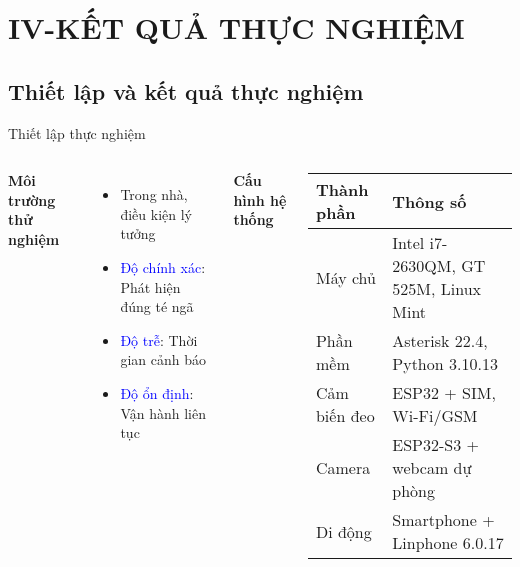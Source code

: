 \section{IV-KẾT QUẢ THỰC NGHIỆM}
\subsection{Thiết lập và kết quả thực nghiệm} 

\begin{frame}{Thiết lập thực nghiệm}
    \begin{columns}[T]
        \textbf{Môi trường thử nghiệm}
        \vspace{0.2cm}
        \begin{itemize}
            \item Trong nhà, điều kiện lý tưởng
            \item \textcolor{blue}{Độ chính xác}: Phát hiện đúng té ngã
            \item \textcolor{blue}{Độ trễ}: Thời gian cảnh báo
            \item \textcolor{blue}{Độ ổn định}: Vận hành liên tục
        \end{itemize}

        \textbf{Cấu hình hệ thống}
        \vspace{0.2cm}
        \begin{table}[h!]
            \centering
            \footnotesize
            \begin{tabular}{|p{2.5cm}|p{4cm}|}
                \hline
                \textbf{Thành phần} & \textbf{Thông số} \\
                \hline
                Máy chủ & Intel i7-2630QM, GT 525M, Linux Mint \\
                \hline
                Phần mềm & Asterisk 22.4, Python 3.10.13 \\
                \hline
                Cảm biến đeo & ESP32 + SIM, Wi-Fi/GSM \\
                \hline
                Camera & ESP32-S3 + webcam dự phòng \\
                \hline
                Di động & Smartphone + Linphone 6.0.17 \\
                \hline
            \end{tabular}
        \end{table}
    \end{columns}
\end{frame}
